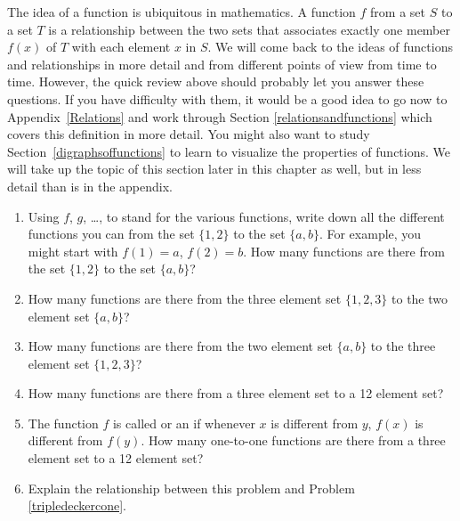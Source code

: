 \iteme The idea of a function is ubiquitous in mathematics.  A
function $f$ from a set $S$ to a set $T$ is a relationship
between the two sets that associates exactly one member $f(x)$
of $T$ with each element $x$ in $S$.    We
will come back to the ideas of functions and relationships in more detail and
from different points of view from time to time.  However, the quick review
above should probably let you answer these questions.  If you have difficulty
with them, it would be a good idea to go now to Appendix~\ref{Relations} and
work through Section \ref{relationsandfunctions} which covers this definition
in more detail. You might also want to study Section~\ref{digraphsoffunctions} to learn
to visualize the properties of functions. We will take up the topic of
this section later in this chapter as well, but in less detail than is
in the appendix.
\begin{enumerate} 
\item Using $f$, $g$, \ldots, to stand for the various
functions, write down all the different functions you can
from the set
$\{1,2\}$ to the set $\{a,b\}$.  For example, you might start
with
$f(1)=a$, $f(2)=b$.  How many functions are there from the
set $\{1,2\}$ to the set
$\{a,b\}$?\label{countingfunctionsparta}
\item How many functions are there from the three element set
$\{1,2,3\}$
 to the two element set $\{a,b\}$?
\item How many functions are there from the two element set $\{a,b\}$ to the
three element set $\{1,2,3\}$?
\item  How many functions are there from a three element set
to a 12 element set? 
\item The function $f$ is called
 or an
 if whenever
$x$ is different from
$y$,
$f(x)$ is different from $f(y)$.  How many one-to-one
functions are there from a three element set to a  12 element
set? 
\item Explain the relationship between this problem and Problem
\ref{tripledeckercone}.
\end{enumerate}\label{countingfunctions}



